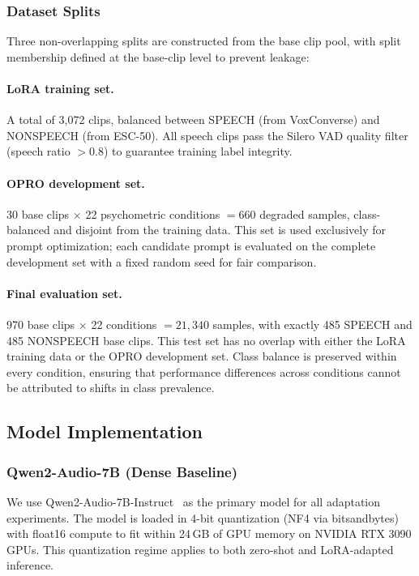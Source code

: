 \documentclass[11pt,a4paper]{article}
\begin{document}
\subsubsection{Dataset Splits}
\label{subsubsec:splits}

Three non-overlapping splits are constructed from the base clip pool, with split membership defined at the base-clip level to prevent leakage:

\paragraph{LoRA training set.}
A total of 3{,}072 clips, balanced between SPEECH (from VoxConverse) and NONSPEECH (from ESC-50). All speech clips pass the Silero VAD quality filter (speech ratio $> 0.8$) to guarantee training label integrity.

\paragraph{OPRO development set.}
30 base clips $\times$ 22 psychometric conditions $= 660$ degraded samples, class-balanced and disjoint from the training data. This set is used exclusively for prompt optimization; each candidate prompt is evaluated on the complete development set with a fixed random seed for fair comparison.

\paragraph{Final evaluation set.}
970 base clips $\times$ 22 conditions $= 21{,}340$ samples, with exactly 485 SPEECH and 485 NONSPEECH base clips. This test set has no overlap with either the LoRA training data or the OPRO development set. Class balance is preserved within every condition, ensuring that performance differences across conditions cannot be attributed to shifts in class prevalence.


\subsection{Model Implementation}
\label{subsec:implementation}

\subsubsection{Qwen2-Audio-7B (Dense Baseline)}
\label{subsubsec:qwen2_config}

We use Qwen2-Audio-7B-Instruct~\cite{chu2024qwen2} as the primary model for all adaptation experiments. The model is loaded in 4-bit quantization (NF4 via bitsandbytes) with float16 compute to fit within 24\,GB of GPU memory on NVIDIA RTX 3090 GPUs. This quantization regime applies to both zero-shot and LoRA-adapted inference.
\end{document}
